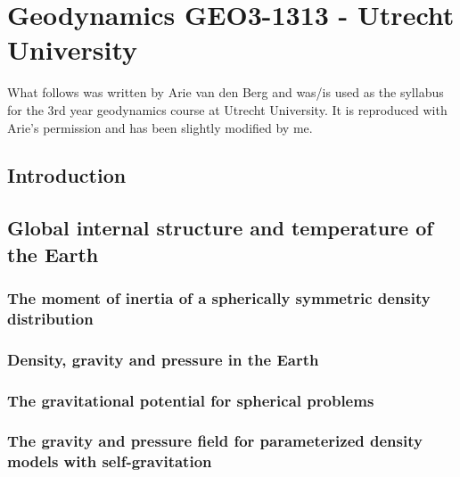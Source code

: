 \documentclass[a4paper]{article}
\numberwithin{equation}{section}
\begin{document}
\section{Geodynamics GEO3-1313 - Utrecht University}
What follows was written by Arie van den Berg and was/is used as the syllabus for the 
3rd year geodynamics course at Utrecht University. It is reproduced with Arie's permission
and has been slightly modified by me.

\subsection{Introduction} %
\subsection{Global internal structure and temperature of the Earth} %
\subsubsection{The moment of inertia of a spherically symmetric density distribution} %
\label{sect_scalarmomint}  %
\subsubsection{Density, gravity and pressure in the Earth} %
\label{section_Density-gravity-pressure}  %

\subsubsection{The gravitational potential for spherical problems}
  

\subsubsection{The gravity and pressure field for parameterized density models with self-gravitation}
\label{sect_param_densmod}  %
\end{document}
